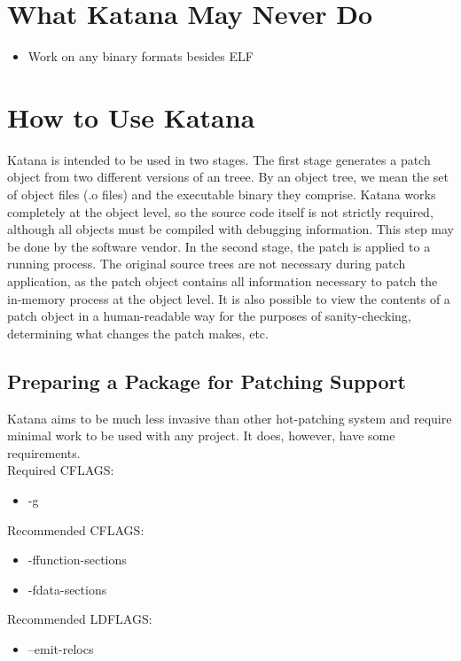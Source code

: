 \documentclass[11pt]{article}
\begin{document}
\section{What Katana May Never Do}
\label{sec-5}

\begin{itemize}
\item Work on any binary formats besides ELF
\end{itemize}
\section{How to Use Katana}
\label{sec-6}

  Katana is intended to be used in two stages. The first stage
  generates a patch object from two different versions of an
  treee. By an object tree, we mean the set of object files (.o files)
  and the executable binary they comprise. Katana works completely at
  the object level, so the source code itself is not strictly
  required, although all objects must be compiled with debugging
  information. This step may be done by the software vendor. In the
  second stage, the patch is applied to a running process. The
  original source trees are not necessary during patch application, as
  the patch object contains all information necessary to patch the
  in-memory process at the object level. It is also possible to view
  the contents of a patch object in a human-readable way for the
  purposes of sanity-checking, determining what changes the patch
  makes, etc.
\subsection{Preparing a Package for Patching Support}
\label{sec-6.1}

   Katana aims to be much less invasive than other hot-patching system
   and require minimal work to be used with any project. It does,
   however, have some requirements.\\
   Required CFLAGS:
\begin{itemize}
\item -g
\end{itemize}
   Recommended CFLAGS:
\begin{itemize}
\item -ffunction-sections
\item -fdata-sections
\end{itemize}
   Recommended LDFLAGS:
\begin{itemize}
\item --emit-relocs
\end{itemize}
\end{document}
